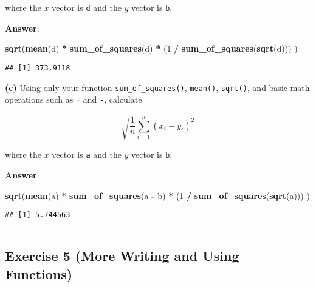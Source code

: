 \documentclass[]{article}
\newenvironment{Shaded}{\begin{snugshade}}{\end{snugshade}}
\newcommand{\KeywordTok}[1]{\textcolor[rgb]{0.13,0.29,0.53}{\textbf{#1}}}
\newcommand{\DecValTok}[1]{\textcolor[rgb]{0.00,0.00,0.81}{#1}}
\newcommand{\StringTok}[1]{\textcolor[rgb]{0.31,0.60,0.02}{#1}}
\newcommand{\OperatorTok}[1]{\textcolor[rgb]{0.81,0.36,0.00}{\textbf{#1}}}
\newcommand{\NormalTok}[1]{#1}
\begin{document}
where the \(x\) vector is \texttt{d} and the \(y\) vector is \texttt{b}.

\textbf{Answer}:

\begin{Shaded}
\begin{Highlighting}[]
\KeywordTok{sqrt}\NormalTok{(}\KeywordTok{mean}\NormalTok{(d) }\OperatorTok{*}\StringTok{ }\KeywordTok{sum_of_squares}\NormalTok{(d) }\OperatorTok{*}\StringTok{ }\NormalTok{(}\DecValTok{1} \OperatorTok{/}\StringTok{ }\KeywordTok{sum_of_squares}\NormalTok{(}\KeywordTok{sqrt}\NormalTok{(d))) )}
\end{Highlighting}
\end{Shaded}

\begin{verbatim}
## [1] 373.9118
\end{verbatim}

\textbf{(c)} Using only your function \texttt{sum\_of\_squares()},
\texttt{mean()}, \texttt{sqrt()}, and basic math operations such as
\texttt{+} and \texttt{-}, calculate

\[
\sqrt{\frac{1}{n}\sum_{i = 1}^n (x_i - y_i)^{2}}
\]

where the \(x\) vector is \texttt{a} and the \(y\) vector is \texttt{b}.

\textbf{Answer}:

\begin{Shaded}
\begin{Highlighting}[]
\KeywordTok{sqrt}\NormalTok{(}\KeywordTok{mean}\NormalTok{(a) }\OperatorTok{*}\StringTok{ }\KeywordTok{sum_of_squares}\NormalTok{(a }\OperatorTok{-}\StringTok{ }\NormalTok{b) }\OperatorTok{*}\StringTok{ }\NormalTok{(}\DecValTok{1} \OperatorTok{/}\StringTok{ }\KeywordTok{sum_of_squares}\NormalTok{(}\KeywordTok{sqrt}\NormalTok{(a))) )}
\end{Highlighting}
\end{Shaded}

\begin{verbatim}
## [1] 5.744563
\end{verbatim}

\begin{center}\rule{0.5\linewidth}{\linethickness}\end{center}

\subsection{Exercise 5 (More Writing and Using
Functions)}\label{exercise-5-more-writing-and-using-functions}
\end{document}
